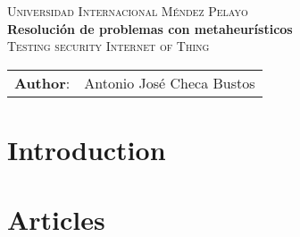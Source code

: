 \documentclass[a4paper,english,11pt]{article}
\begin{document}
	
	\renewcommand*{\thepage}{\roman{page}}
	\newcommand{\IoT}{\textbf{IoT} }
	
	\begin{titlepage}
		\begin{center}
			\vspace*{0,5cm} 
			{\Large \textsc{Universidad Internacional Méndez Pelayo\\}}
			\vspace{3mm}
			{\huge \textbf{Resolución de problemas con metaheurísticos}} \\
			\vspace{1,7cm}
			{\Large \textsc{Testing security Internet of Thing\\}}
			
		\end{center}
		\vspace{12.3cm}
		\begin{table}[!h]
			\Large
			\begin{tabular}{rl}
				\textbf{Author}: & Antonio José Checa Bustos\\
				
			\end{tabular}
		\end{table}
	\end{titlepage}
	
	
	
	
	\newpage
	\thispagestyle{empty}
	\renewcommand{\contentsname}{Contents}
	\renewcommand{\refname}{References}
	\tableofcontents
	\newpage
	
	\pagestyle{fancy}
	\fancyfoot[C]{\thepage}
	\renewcommand{\sectionmark}[1]{\markboth{\textbf{\thesection. #1}}{}}
	\renewcommand*{\thepage}{\arabic{page}}
	\setcounter{page}{1}
	
	\section{Introduction}
	\label{sec:intro}
		
	
	\newpage
	
	\section{Articles}
	\label{sec:articulos}
		
	
\end{document}
